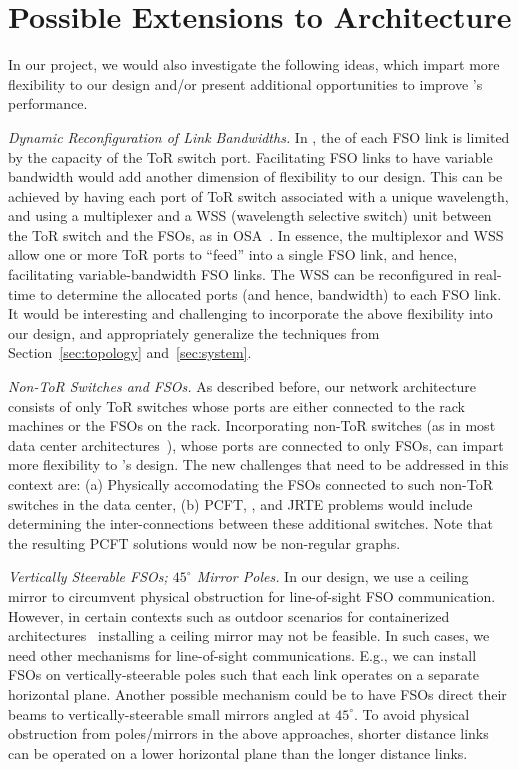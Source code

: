 \section{Possible Extensions to \ArchName Architecture}
\label{sec:ext}

In our project, we would also investigate the following ideas, which
impart more flexibility to our design and/or present additional
opportunities to improve \ArchName's performance.

\begin{packeditemize}
\item
{\em Dynamic Reconfiguration of Link Bandwidths.}  In \ArchName, the
 of each FSO link is limited by the capacity of the
ToR switch port. Facilitating FSO links to have variable bandwidth
would add another dimension of flexibility to our design. 
%
This can be achieved by having each port of ToR switch associated with
a unique wavelength, and using a multiplexer and a WSS (wavelength
selective switch) unit between the ToR switch and the FSOs, as in
OSA~\cite{osa-tr}. In essence, the multiplexor and WSS allow one or
more ToR ports to ``feed'' into a single FSO link, and hence,
facilitating variable-bandwidth FSO links. The WSS can be reconfigured
in real-time to determine the allocated ports (and hence, bandwidth)
to each FSO link.
%
It would be interesting and challenging to incorporate the above
flexibility into our design, and appropriately generalize the
techniques from Section~\ref{sec:topology} and~\ref{sec:system}.

\item
{\em Non-ToR Switches and FSOs.} As described before, our network
architecture consists of only ToR switches whose ports are either
connected to the rack machines or the FSOs on the rack. Incorporating
non-ToR switches (as in most data center architectures~\cite{}), whose
ports are connected to only FSOs, can impart more flexibility to
\ArchName's design. The new challenges that need to be addressed in
this context are: (a) Physically accomodating the FSOs connected to
such non-ToR switches in the data center, (b) PCFT, \BBO, and JRTE
problems would include determining the inter-connections between these
additional switches. Note that the resulting PCFT solutions would now
be non-regular graphs.

\item
{\em Vertically Steerable FSOs; $45^\circ$ Mirror Poles.} In our
design, we use a ceiling mirror to circumvent physical obstruction for
line-of-sight FSO communication. However, in certain contexts such as
outdoor scenarios for containerized architectures~\cite{dc-container}
installing a ceiling mirror may not be feasible. In such cases, we
need other mechanisms for line-of-sight communications.  E.g., we can
install FSOs on vertically-steerable poles such that each link
operates on a separate horizontal plane. Another possible mechanism
could be to have FSOs direct their beams to vertically-steerable small
mirrors angled at $45^\circ$. To avoid physical obstruction from
poles/mirrors in the above approaches, shorter distance links can be
operated on a lower horizontal plane than the longer distance links.
\end{packeditemize}

